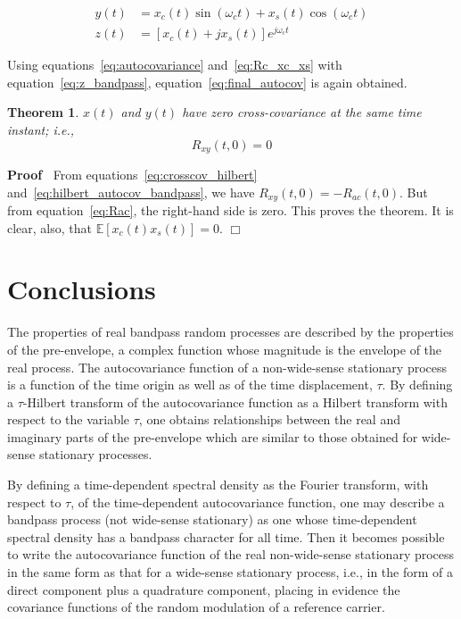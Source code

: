 \documentclass{article}
\newenvironment{proof}{\noindent\textbf{Proof\ }}{\hspace*{\fill}$\Box$\medskip}
\newtheorem{theorem}{Theorem}
\begin{document}
\begin{align}
  y (t) & = x_c (t) \sin (\omega_c t) + x_s (t) \cos (\omega_c t) 
  \label{eq:y_bandpass}\\
  z (t) & = [x_c (t) + jx_s (t)] e^{j \omega_c t}  \label{eq:z_bandpass}
\end{align}

Using equations~\eqref{eq:autocovariance} and~\eqref{eq:Rc_xc_xs} with
equation~\eqref{eq:z_bandpass}, equation~\eqref{eq:final_autocov} is again
obtained.

\begin{theorem}
  \label{thm:zero_crosscov}$x (t)$ and $y (t)$ have zero cross-covariance at
  the same time instant; i.e.,
  \begin{equation}
    R_{xy} (t, 0) = 0 \label{eq:zero_crosscov}
  \end{equation}
\end{theorem}

\begin{proof}
  From equations~\eqref{eq:crosscov_hilbert}
  and~\eqref{eq:hilbert_autocov_bandpass}, we have $R_{xy} (t, 0) = - R_{ac}
  (t, 0)$. But from equation~\eqref{eq:Rac}, the right-hand side is zero. This
  proves the theorem. It is clear, also, that $\mathbb{E} [x_c (t) x_s (t)] =
  0$.
\end{proof}

\section{Conclusions}

The properties of real bandpass random processes are described by the
properties of the pre-envelope, a complex function whose magnitude is the
envelope of the real process. The autocovariance function of a non-wide-sense
stationary process is a function of the time origin as well as of the time
displacement, $\tau$. By defining a $\tau$-Hilbert transform of the
autocovariance function as a Hilbert transform with respect to the variable
$\tau$, one obtains relationships between the real and imaginary parts of the
pre-envelope which are similar to those obtained for wide-sense stationary
processes.

By defining a time-dependent spectral density as the Fourier transform, with
respect to $\tau$, of the time-dependent autocovariance function, one may
describe a bandpass process (not wide-sense stationary) as one whose
time-dependent spectral density has a bandpass character for all time. Then it
becomes possible to write the autocovariance function of the real
non-wide-sense stationary process in the same form as that for a wide-sense
stationary process, i.e., in the form of a direct component plus a quadrature
component, placing in evidence the covariance functions of the random
modulation of a reference carrier.
\end{document}
